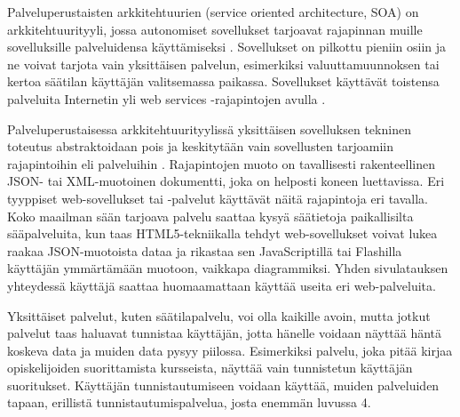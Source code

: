 Palveluperustaisten arkkitehtuurien (service oriented architecture, SOA) on arkkitehtuurityyli, jossa autonomiset sovellukset tarjoavat rajapinnan muille sovelluksille palveluidensa käyttämiseksi \cite{soa}. Sovellukset on pilkottu pieniin osiin ja ne voivat tarjota vain yksittäisen palvelun, esimerkiksi valuuttamuunnoksen tai kertoa säätilan käyttäjän valitsemassa paikassa. Sovellukset käyttävät toistensa palveluita Internetin yli web services -rajapintojen avulla \cite{soa}.

Palveluperustaisessa arkkitehtuurityylissä yksittäisen sovelluksen tekninen toteutus abstraktoidaan pois ja keskitytään vain sovellusten tarjoamiin rajapintoihin eli palveluihin \cite{soa}. Rajapintojen muoto on tavallisesti rakenteellinen JSON- tai XML-muotoinen dokumentti, joka on helposti koneen luettavissa. Eri tyyppiset web-sovellukset tai -palvelut käyttävät näitä rajapintoja eri tavalla. Koko maailman sään tarjoava palvelu saattaa kysyä säätietoja paikallisilta sääpalveluita, kun taas HTML5-tekniikalla tehdyt web-sovellukset voivat lukea raakaa JSON-muotoista dataa ja rikastaa sen JavaScriptillä tai Flashilla käyttäjän ymmärtämään muotoon, vaikkapa diagrammiksi. Yhden sivulatauksen yhteydessä käyttäjä saattaa huomaamattaan käyttää useita eri web-palveluita.

Yksittäiset palvelut, kuten säätilapalvelu, voi olla kaikille avoin, mutta jotkut palvelut taas haluavat tunnistaa käyttäjän, jotta hänelle voidaan näyttää häntä koskeva data ja muiden data pysyy piilossa. Esimerkiksi palvelu, joka pitää kirjaa opiskelijoiden suorittamista kursseista, näyttää vain tunnistetun käyttäjän suoritukset. Käyttäjän tunnistautumiseen voidaan käyttää, muiden palveluiden tapaan, erillistä tunnistautumispalvelua, josta enemmän luvussa 4.
